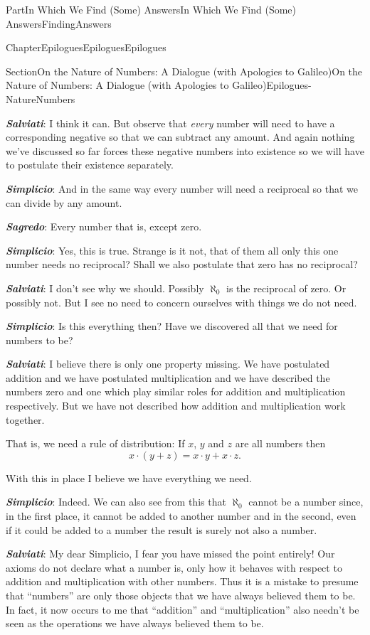 \documentclass[oneside,10pt,]{book}
\newcommand{\alert}[1]{\textbf{\textit{#1}}}
\numberwithin{equation}{part}
\begin{document}
\begin{partptx}{Part}{In Which We Find (Some) Answers}{}{In Which We Find (Some) Answers}{}{}{FindingAnswers}
\begin{chapterptx}{Chapter}{Epilogues}{}{Epilogues}{}{}{Epilogues}
\begin{sectionptx}{Section}{On the Nature of Numbers: A Dialogue (with Apologies to Galileo)}{}{On the Nature of Numbers: A Dialogue (with Apologies to Galileo)}{}{}{Epilogues-NatureNumbers}
\begin{introduction}{}
\par
\alert{Salviati}:  I think it can. But observe that \emph{every} number will need to have a corresponding negative so that we can subtract any amount. And again nothing we've discussed so far forces these negative numbers into existence so we will have to postulate their existence separately.%
\par
\alert{Simplicio}:  And in the same way every number will need a reciprocal so that we can divide by any amount.%
\par
\alert{Sagredo}:  Every number that is, except zero.%
\par
\alert{Simplicio}:  Yes, this is true. Strange is it not, that of them all only this one number needs no reciprocal? Shall we also postulate that zero has no reciprocal?%
\par
\alert{Salviati}: I don't see why we should. Possibly \(\aleph_0\) is the reciprocal of zero. Or possibly not. But I see no need to concern ourselves with things we do not need.%
\par
\alert{Simplicio}: Is this everything then? Have we discovered all that we need for numbers to be?%
\par
\alert{Salviati}: I believe there is only one property missing. We have postulated addition and we have postulated multiplication and we have described the numbers zero and one which play similar roles for addition and multiplication respectively. But we have not described how addition and multiplication work together.%
\par
That is, we need a rule of distribution:  If \(x\), \(y\) and \(z\) are all numbers then%
\begin{equation*}
x\cdot(y+z) = x\cdot y+x\cdot z\text{.}
\end{equation*}
%
\par
With this in place I believe we have everything we need.%
\par
\alert{Simplicio}:  Indeed. We can also see from this that \(\aleph_0\) cannot be a number since, in the first place, it cannot be added to another number and in the second, even if it could be added to a number the result is surely not also a number.%
\par
\alert{Salviati}:  My dear Simplicio, I fear you have missed the point entirely! Our axioms do not declare what a number is, only how it behaves with respect to addition and multiplication with other numbers. Thus it is a mistake to presume that ``numbers'' are only those objects that we have always believed them to be. In fact, it now occurs to me that ``addition'' and ``multiplication'' also needn't be seen as the operations we have always believed them to be.%

\end{introduction}
\end{sectionptx}
\end{chapterptx}
\end{partptx}
\end{document}
